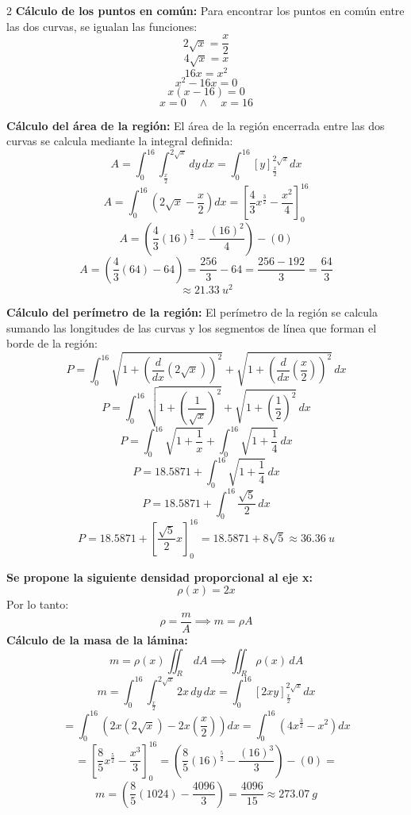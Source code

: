 \begin{multicols}{2}
  \textbf{Cálculo de los puntos en común:}
  Para encontrar los puntos en común entre las dos curvas, se igualan las funciones:
  \[2\sqrt{x} = \frac{x}{2}\]
  \[4\sqrt{x} = x\]
  \[16x = x^{2}\]
  \[x^{2} - 16x = 0\]
  \[x(x - 16) = 0\]
  \[x = 0 \quad \land \quad x = 16\]

  \textbf{Cálculo del área de la región:}
  El área de la región encerrada entre las dos curvas se calcula mediante la integral definida:
  \[A = \int_0^{16} \int_{\frac{x}{2}}^{2\sqrt{x}} dy \, dx = \int_0^{16} \left[ y \right]_{\frac{x}{2}}^{2\sqrt{x}} dx\]
  \[A = \int_0^{16} \left( 2\sqrt{x} - \frac{x}{2} \right) dx = \left[ \frac{4}{3}x^{\frac{3}{2}} - \frac{x^{2}}{4} \right]_0^{16}\]
  \[A = \left( \frac{4}{3}(16)^{\frac{3}{2}} - \frac{(16)^{2}}{4} \right) - \left( 0 \right)\]
  \[A = \left( \frac{4}{3}(64) - 64 \right) = \frac{256}{3} - 64 = \frac{256 - 192}{3} = \frac{64}{3}\]
  \[\approx 21.33\ u^{2}\]
  
  \textbf{Cálculo del perímetro de la región:}
  El perímetro de la región se calcula sumando las longitudes de las curvas y los segmentos de línea que forman el borde de la región:
  \[P = \int_0^{16} \sqrt{1 + \left( \frac{d}{dx}(2\sqrt{x}) \right)^{2}} + \sqrt{1 + \left( \frac{d}{dx}\left(\frac{x}{2}\right) \right)^{2}} \, dx\]
  \[P = \int_0^{16} \sqrt{1 + \left( \frac{1}{\sqrt{x}} \right)^{2}} + \sqrt{1 + \left( \frac{1}{2} \right)^{2}} \, dx\]
  \[P = \int_0^{16} \sqrt{1 + \frac{1}{x}} + \int_{0}^{16}\sqrt{1 + \frac{1}{4}} \, dx\]
  \[P = 18.5871 + \int_{0}^{16}\sqrt{1 + \frac{1}{4}} \, dx\]
  \[P = 18.5871 + \int_{0}^{16}\frac{\sqrt{5}}{2} \, dx\]
  \[P = 18.5871 + \left[ \frac{\sqrt{5}}{2}x \right]_0^{16} = 18.5871 + 8\sqrt{5} \approx 36.36\ u\]

  \textbf{Se propone la siguiente densidad proporcional al eje x:}
  \[\rho(x) = 2x\] 
  Por lo tanto:
  \[\rho=\frac{m}{A} \implies m = \rho A\]
  \textbf{Cálculo de la masa de la lámina:}
  \[m= \rho (x)\iint_R \, dA \implies \iint_R \rho (x) \, dA\]
  \[m = \int_0^{16} \int_{\frac{x}{2}}^{2\sqrt{x}} 2x \, dy \, dx = \int_0^{16} \left[ 2xy \right]_{\frac{x}{2}}^{2\sqrt{x}} dx\]
  \[=\int_0^{16} \left( 2x(2\sqrt{x}) - 2x\left(\frac{x}{2}\right) \right) dx = \int_0^{16} \left( 4x^{\frac{3}{2}} - x^{2} \right) dx\]
  \[= \left[ \frac{8}{5}x^{\frac{5}{2}} - \frac{x^{3}}{3} \right]_0^{16} = \left( \frac{8}{5}(16)^{\frac{5}{2}} - \frac{(16)^{3}}{3} \right) - (0)=\]
  \[m = \left( \frac{8}{5}(1024) - \frac{4096}{3} \right) = \frac{4096}{15} \approx 273.07\ g\]
\end{multicols}

